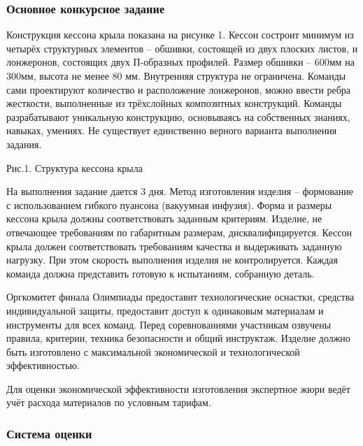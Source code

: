 \subsubsection*{Основное конкурсное задание}

Конструкция кессона крыла показана на рисунке 1. Кессон состроит минимум из четырёх структурных элементов – обшивки, состоящей из двух плоских листов, и лонжеронов, состоящих двух П-образных профилей. Размер обшивки – 600мм на 300мм, высота не менее 80 мм. Внутренняя структура не ограничена. Команды сами проектируют количество и расположение лонжеронов, можно ввести ребра жесткости, выполненные из трёхслойных композитных конструкций. Команды разрабатывают уникальную конструкцию, основываясь на собственных знаниях, навыках, умениях. Не существует единственно верного варианта выполнения задания.
 

\begin{center}
    Рис.1. Структура кессона крыла
\end{center}

На выполнения задание дается 3 дня. Метод изготовления изделия – формование с использованием гибкого пуансона (вакуумная инфузия). Форма и размеры кессона крыла должны соответствовать заданным критериям. Изделие, не отвечающее требованиям по габаритным размерам, дисквалифицируется. Кессон крыла должен соответствовать требованиям качества и выдерживать заданную нагрузку. При этом скорость выполнения изделия не контролируется. Каждая команда должна представить готовую к испытаниям, собранную деталь.

Оргкомитет финала Олимпиады предоставит технологические оснастки, средства индивидуальной защиты, предоставит доступ к одинаковым материалам и инструменты для всех команд. Перед соревнованиями участникам озвучены правила, критерии, техника безопасности и общий инструктаж.
Изделие должно быть изготовлено с максимальной экономической и технологической эффективностью.

Для оценки экономической эффективности изготовления экспертное жюри ведёт учёт расхода материалов по условным тарифам.

\subsubsection*{Система оценки}


